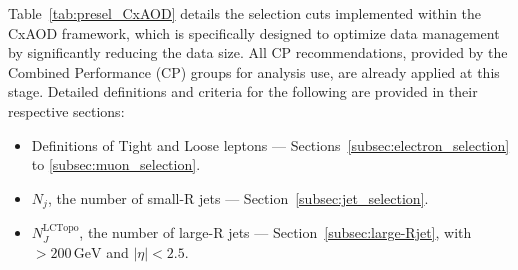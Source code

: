 \label{subsec:event_preselection}

Table~\ref{tab:presel_CxAOD} details the selection cuts implemented within the CxAOD framework, which is specifically designed to optimize data management by significantly reducing the data size. 
All CP recommendations, provided by the Combined Performance (CP) groups for analysis use, are already applied at this stage.
Detailed definitions and criteria for the following are provided in their respective sections:
\begin{itemize}
    \item Definitions of Tight and Loose leptons — Sections~\ref{subsec:electron_selection} to \ref{subsec:muon_selection}.
    \item $N_j$, the number of small-R jets — Section~\ref{subsec:jet_selection}.
    \item $N_J^{\textrm{LCTopo}}$, the number of large-R jets — Section~\ref{subsec:large-Rjet}, with \pt$>200\,\si{\GeV}$ and $\left| \eta \right| < 2.5$.
\end{itemize}


\begin{table}[h]
  \caption{List of the pre-selections applied in the CxAOD framework to reduce the data size.}
\label{tab:presel_CxAOD}
\begin{center}
\end{center}
\end{table}
